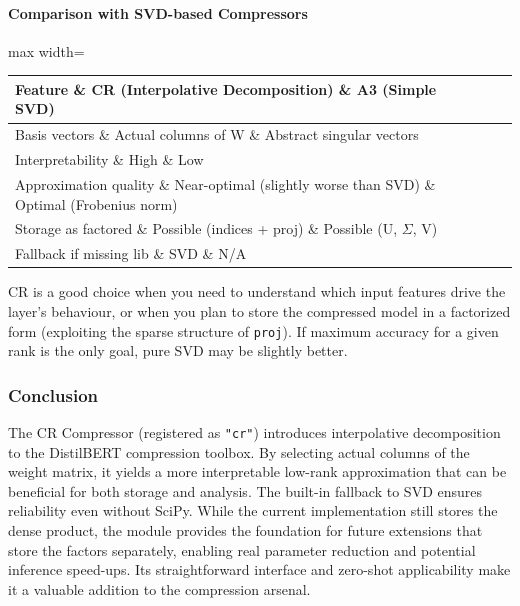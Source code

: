 \paragraph{Comparison with SVD-based Compressors}

\begin{center}
\begin{adjustbox}{max width=\columnwidth}
\renewcommand{\arraystretch}{1.2}
\begin{tabular}{lll}
\toprule
Feature \& CR (Interpolative Decomposition) \& A3 (Simple SVD) \\
\midrule
Basis vectors \& Actual columns of W \& Abstract singular vectors \\
Interpretability \& High \& Low \\
Approximation quality \& Near-optimal (slightly worse than SVD) \& Optimal (Frobenius norm) \\
Storage as factored \& Possible (indices + proj) \& Possible (U, $\Sigma$, V) \\
Fallback if missing lib \& SVD \& N/A \\

\bottomrule
\end{tabular}
\end{adjustbox}
\end{center}
CR is a good choice when you need to understand which input features drive the layer's behaviour, or when you plan to store the compressed model in a factorized form (exploiting the sparse structure of \texttt{proj}). If maximum accuracy for a given rank is the only goal, pure SVD may be slightly better.


\subsubsection*{Conclusion}

The CR Compressor (registered as \texttt{"cr"}) introduces interpolative decomposition to the DistilBERT compression toolbox. By selecting actual columns of the weight matrix, it yields a more interpretable low-rank approximation that can be beneficial for both storage and analysis. The built-in fallback to SVD ensures reliability even without SciPy. While the current implementation still stores the dense product, the module provides the foundation for future extensions that store the factors separately, enabling real parameter reduction and potential inference speed-ups. Its straightforward interface and zero-shot applicability make it a valuable addition to the compression arsenal.

